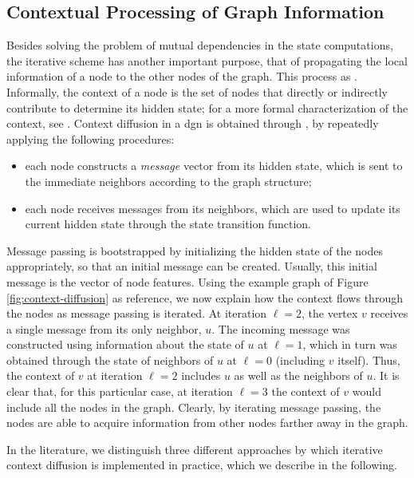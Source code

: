\subsection{Contextual Processing of Graph Information}
Besides solving the problem of mutual dependencies in the state computations, the iterative scheme has another important purpose, that of propagating the local information of a node to the other nodes of the graph. This process as . Informally, the context of a node is the set of nodes that directly or indirectly contribute to determine its hidden state; for a more formal characterization of the context, see \citep{micheli2009nn4g}. Context diffusion in a \gls{dgn} is obtained through , \ie by repeatedly applying the following procedures:
\begin{itemize}
    \item each node constructs a \emph{message} vector from its hidden state, which is sent to the immediate neighbors according to the graph structure;
    \item each node receives messages from its neighbors, which are used to update its current hidden state through the state transition function.
\end{itemize}
Message passing is bootstrapped by initializing the hidden state of the nodes appropriately, so that an initial message can be created. Usually, this initial message is the vector of node features. Using the example graph of Figure \ref{fig:context-diffusion} as reference, we now explain how the context flows through the nodes as message passing is iterated. At iteration $\ell=2$, the vertex $v$ receives a single message from its only neighbor, $u$. The incoming message was constructed using information about the state of $u$ at $\ell=1$, which in turn was obtained through the state of neighbors of $u$ at $\ell=0$ (including $v$ itself). Thus, the context of $v$ at iteration $\ell=2$ includes $u$ as well as the neighbors of $u$. It is clear that, for this particular case, at iteration $\ell=3$ the context of $v$ would include all the nodes in the graph. Clearly, by iterating message passing, the nodes are able to acquire information from other nodes farther away in the graph.
\begin{figure*}[h!]
    \centering
    \resizebox{.8\textwidth}{!}{}
    \caption{Context diffusion through message passing. Directed edges represent messages (\eg from node $u$ to $v$ at iteration $\ell=2$). Dashed arrows represent the implicit contextual information received by a node (in dark gray) through the messages from its neighbors (in light gray). Focusing on node $v$, its context at iteration $\ell=2$ is composed all the dark gray nodes (including $v$ itself).}
    \label{fig:context-diffusion}
\end{figure*}
In the literature, we distinguish three different approaches by which iterative context diffusion is implemented in practice, which we describe in the following.

